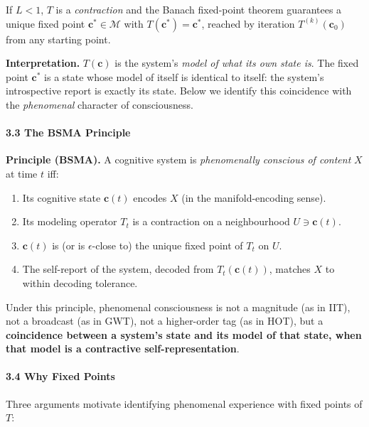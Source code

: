 \documentclass[
  11pt,
  a4paper,
]{article}
\providecommand{\tightlist}{%
  \setlength{\itemsep}{0pt}\setlength{\parskip}{0pt}}
\begin{document}
If \(L < 1\), \(T\) is a \emph{contraction} and the Banach fixed-point
theorem guarantees a unique fixed point \(\mathbf{c}^* \in \mathcal{M}\)
with \(T(\mathbf{c}^*) = \mathbf{c}^*\), reached by iteration
\(T^{(k)}(\mathbf{c}_0)\) from any starting point.

\textbf{Interpretation.} \(T(\mathbf{c})\) is the system's \emph{model
of what its own state is}. The fixed point \(\mathbf{c}^*\) is a state
whose model of itself is identical to itself: the system's introspective
report is exactly its state. Below we identify this coincidence with the
\emph{phenomenal} character of consciousness.

\paragraph{3.3 The BSMA Principle}\label{the-bsma-principle}

\textbf{Principle (BSMA).} A cognitive system is \emph{phenomenally
conscious of content} \(X\) at time \(t\) iff:

\begin{enumerate}
\def\labelenumi{\arabic{enumi}.}
\tightlist
\item
  Its cognitive state \(\mathbf{c}(t)\) encodes \(X\) (in the
  manifold-encoding sense).
\item
  Its modeling operator \(T_t\) is a contraction on a neighbourhood
  \(U \ni \mathbf{c}(t)\).
\item
  \(\mathbf{c}(t)\) is (or is \(\epsilon\)-close to) the unique fixed
  point of \(T_t\) on \(U\).
\item
  The self-report of the system, decoded from \(T_t(\mathbf{c}(t))\),
  matches \(X\) to within decoding tolerance.
\end{enumerate}

Under this principle, phenomenal consciousness is not a magnitude (as in
IIT), not a broadcast (as in GWT), not a higher-order tag (as in HOT),
but a \textbf{coincidence between a system's state and its model of that
state, when that model is a contractive self-representation}.

\paragraph{3.4 Why Fixed Points}\label{why-fixed-points}

Three arguments motivate identifying phenomenal experience with fixed
points of \(T\):
\end{document}
